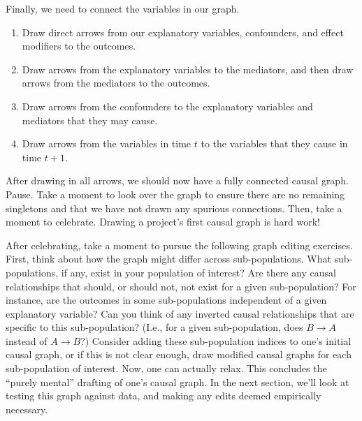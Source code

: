 Finally, we need to connect the variables in our graph.
\begin{enumerate}
   \item Draw direct arrows from our explanatory variables, confounders, and effect modifiers to the outcomes.
   \item Draw arrows from the explanatory variables to the mediators, and then draw arrows from the mediators to the outcomes.
   \item Draw arrows from the confounders to the explanatory variables and mediators that they may cause.
   \item Draw arrows from the variables in time $t$ to the variables that they cause in time $t+1$.
\end{enumerate}
After drawing in all arrows, we should now have a fully connected causal graph.
Pause.
Take a moment to look over the graph to ensure there are no remaining singletons and that we have not drawn any spurious connections.
Then, take a moment to celebrate.
Drawing a project's first causal graph is hard work!

After celebrating, take a moment to pursue the following graph editing exercises.
First, think about how the graph might differ across sub-populations.
What sub-populations, if any, exist in your population of interest?
Are there any causal relationships that should, or should not, not exist for a given sub-population?
For instance, are the outcomes in some sub-populations independent of a given explanatory variable?
Can you think of any inverted causal relationships that are specific to this sub-population?
(I.e., for a given sub-population, does $B \rightarrow A$ instead of $A \rightarrow B$?)
Consider adding these sub-population indices to one's initial causal graph, or if this is not clear enough, draw modified causal graphs for each sub-population of interest.
Now, one can actually relax.
This concludes the ``purely mental'' drafting of one's causal graph.
In the next section, we'll look at testing this graph against data, and making any edits deemed empirically necessary.
